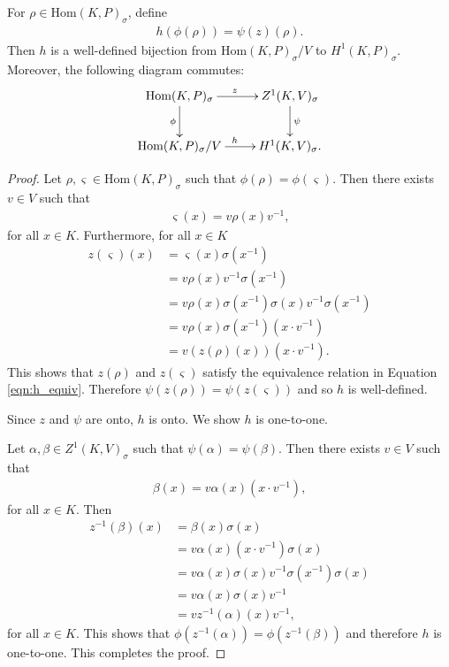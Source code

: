 \begin{lemma} \label{maph}
For $\rho \in \mathrm{Hom}(K, P)_\sigma$, define
\begin{align*}
h(\phi( \rho)) = \psi(z)(\rho).
\end{align*}
Then $h$ is a well-defined bijection from $\mathrm{Hom}(K, P)_\sigma / V$ to $H^1(K, P)_\sigma$. Moreover, the following diagram commutes:
  \begin{align*}
    \xymatrix{
    \mathrm{Hom}(K, P)_{\sigma} \ar[r]^z \ar[d]_\phi & Z^{1}(K, V)_\sigma \ar[d]^\psi \\
    \mathrm{Hom}(K, P)_{\sigma}/V \ar[r]^h & H^{1}(K, V)_\sigma.
    }
  \end{align*}
  \label{lem:v_h1}
\end{lemma}
\begin{proof}  
Let $\rho, \varsigma \in \mathrm{Hom}(K, P)_\sigma$ such that $\phi(\rho) = \phi(\varsigma)$. Then there exists $v \in V$ such that
\begin{align*} \varsigma(x) =  v\rho(x)v^{-1}, \end{align*}
for all $x \in K$. Furthermore, for all $x \in K$
\begin{align*}
z(\varsigma)(x) %
&= \varsigma(x)\sigma(x^{-1}) \\
&= v \rho(x) v^{-1} \sigma(x^{-1}) \\
&= v \rho(x) \sigma(x^{-1})\sigma(x) v^{-1} \sigma(x^{-1}) \\
&= v \rho(x) \sigma(x^{-1}) \left(x \cdot v^{-1}\right) \\
&= v \left(z(\rho)(x)\right) \left(x \cdot v^{-1}\right).
\end{align*}
This shows that $z(\rho)$ and $z(\varsigma)$ satisfy the equivalence relation in Equation \ref{eqn:h_equiv}. Therefore $\psi\left(z(\rho)\right) = \psi\left(z(\varsigma)\right)$ and so $h$ is well-defined.

Since $z$ and $\psi$ are onto, $h$ is onto. We show $h$ is one-to-one.

Let $\alpha, \beta \in Z^1(K, V)_\sigma$ such that $\psi(\alpha) = \psi(\beta)$. Then there exists $v \in V$ such that
\begin{align*} \beta(x) = v \alpha(x) \left(x \cdot v^{-1}\right), \end{align*}
for all $x \in K$. Then
\begin{align*}
z^{-1}(\beta)(x) 
&= \beta(x)\sigma(x) \\
&= v \alpha(x) \left(x \cdot v^{-1}\right) \sigma(x) \\
&= v \alpha(x) \sigma(x) v^{-1} \sigma(x^{-1}) \sigma(x) \\
&= v \alpha(x) \sigma(x) v^{-1} \\
&= v z^{-1}(\alpha)(x) v^{-1},
\end{align*}
for all $x \in K$.
This shows that $\phi\left(z^{-1}(\alpha)\right) = \phi\left(z^{-1}(\beta)\right)$ and therefore $h$ is one-to-one. This completes the proof.
\end{proof}

